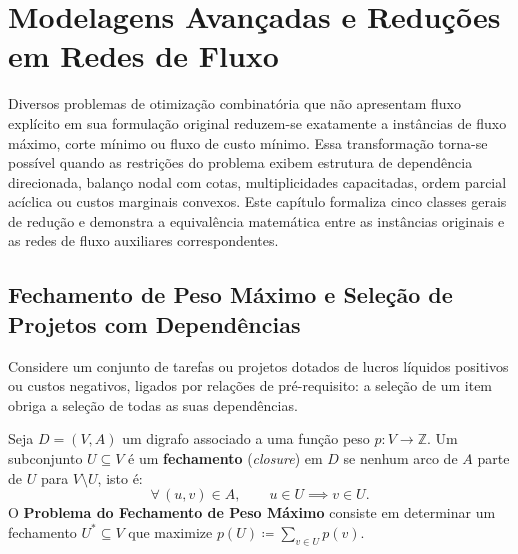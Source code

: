 \chapter{Modelagens Avançadas e Reduções em Redes de Fluxo}\label{sec:modelagens_avancadas}

Diversos problemas de otimização combinatória que não apresentam fluxo explícito em sua formulação original reduzem-se exatamente a instâncias de fluxo máximo, corte mínimo ou fluxo de custo mínimo. Essa transformação torna-se possível quando as restrições do problema exibem estrutura de dependência direcionada, balanço nodal com cotas, multiplicidades capacitadas, ordem parcial acíclica ou custos marginais convexos. Este capítulo formaliza cinco classes gerais de redução e demonstra a equivalência matemática entre as instâncias originais e as redes de fluxo auxiliares correspondentes.


\section{Fechamento de Peso Máximo e Seleção de Projetos com Dependências}\label{sec:max_weight_closure}

Considere um conjunto de tarefas ou projetos dotados de lucros líquidos positivos ou custos negativos, ligados por relações de pré-requisito: a seleção de um item obriga a seleção de todas as suas dependências.

\begin{definicao}
Seja $D = (V, A)$ um digrafo associado a uma função peso $p: V \to \mathbb{Z}$. Um subconjunto $U \subseteq V$ é um \textbf{fechamento} (\textit{closure}) em $D$ se nenhum arco de $A$ parte de $U$ para $V \setminus U$, isto é:
\begin{equation}
    \forall\, (u, v) \in A, \qquad u \in U \implies v \in U.
\end{equation}
O \textbf{Problema do Fechamento de Peso Máximo} consiste em determinar um fechamento $U^* \subseteq V$ que maximize $p(U) \coloneqq \sum_{v \in U} p(v)$.
\end{definicao}

